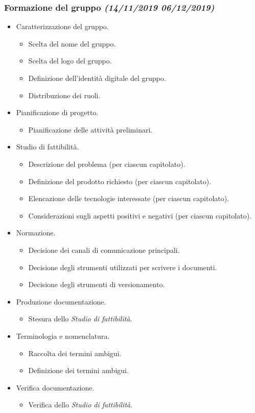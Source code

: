 \documentclass[../piano-di-progetto.tex]{subfiles}
\begin{document}
\subsubsection[Formazione del gruppo]{Formazione del gruppo {\normalsize\normalfont\itshape(14/11/2019  06/12/2019)}}%
\label{subs:formazione_del_gruppo}
\begin{itemize}
  \item Caratterizzazione del gruppo.
  \begin{itemize}
    \item Scelta del nome del gruppo.
    \item Scelta del logo del gruppo.
    \item Definizione dell'identità digitale del gruppo.
    \item Distribuzione dei ruoli.
  \end{itemize}
  \item Pianificazione di progetto.
  \begin{itemize}
    \item Pianificazione delle attività preliminari.
  \end{itemize}
  \item Studio di fattibilità.
  \begin{itemize}
    \item Descrizione del problema (per ciascun capitolato).
    \item Definizione del prodotto richiesto (per ciascun capitolato).
    \item Elencazione delle tecnologie interessate (per ciascun capitolato).
    \item Considerazioni sugli aspetti positivi e negativi (per ciascun capitolato).
  \end{itemize}
  \item Normazione.
  \begin{itemize}
    \item Decisione dei canali di comunicazione principali.
    \item Decisione degli strumenti utilizzati per scrivere i documenti.
    \item Decisione degli strumenti di versionamento.
  \end{itemize}
  \item Produzione documentazione.
  \begin{itemize}
    \item Stesura dello \textit{Studio di fattibilità}.
  \end{itemize}
  \item Terminologia e nomenclatura.
  \begin{itemize}
    \item Raccolta dei termini ambigui.
    \item Definizione dei termini ambigui.
  \end{itemize}
  \item Verifica documentazione.
  \begin{itemize}
    \item Verifica dello \textit{Studio di fattibilità}.
  \end{itemize}
\end{itemize}
\end{document}
